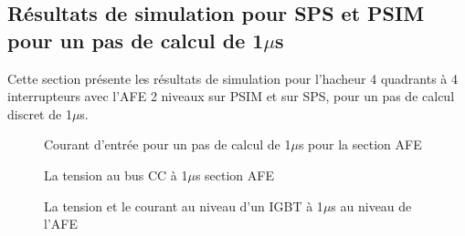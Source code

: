 \subsection{Résultats de simulation pour SPS et PSIM pour un pas de calcul de 1$\mu$s}
Cette section présente les résultats de simulation pour l'hacheur 4 quadrants à 4 interrupteurs avec l'AFE 2 niveaux sur PSIM et sur SPS, pour un pas de calcul discret de 1$\mu$s. 


\begin{figure}[htb]
\caption{Courant d'entrée pour un pas de calcul de 1$\mu$s pour la section AFE}
\label{AF_HA_cou1}
\end{figure}


\begin{figure}[htb]
\caption{La tension au bus CC à 1$\mu$s section AFE}
\label{AF_HA_vch1}
\end{figure}



\begin{figure}[htb]
\caption{La tension et le courant au niveau d'un IGBT à 1$\mu$s au niveau de l'AFE}
\label{AF_HA_IGBT1}
\end{figure}


